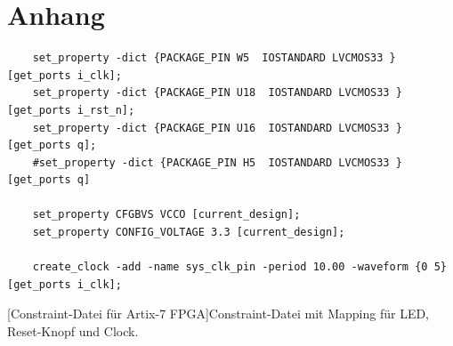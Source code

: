 
\appendix
\chapter{Anhang}
\label{sec:anhang}
\raggedbottom

\begin{verbatim}
    set_property -dict {PACKAGE_PIN W5  IOSTANDARD LVCMOS33 } [get_ports i_clk];
    set_property -dict {PACKAGE_PIN U18  IOSTANDARD LVCMOS33 } [get_ports i_rst_n];
    set_property -dict {PACKAGE_PIN U16  IOSTANDARD LVCMOS33 } [get_ports q];
    #set_property -dict {PACKAGE_PIN H5  IOSTANDARD LVCMOS33 } [get_ports q]

    set_property CFGBVS VCCO [current_design];
    set_property CONFIG_VOLTAGE 3.3 [current_design];

    create_clock -add -name sys_clk_pin -period 10.00 -waveform {0 5} [get_ports i_clk];
\end{verbatim}
[Constraint-Datei für Artix-7 FPGA]{Constraint-Datei mit Mapping für LED, Reset-Knopf und Clock.}
\label{lst:constraint-datei}

\newpage

